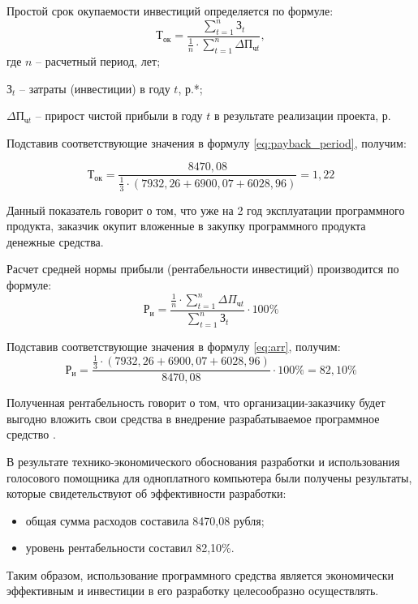 Простой срок окупаемости инвестиций определяется по формуле:
\begin{equation}
	\label{eq:payback_period}
	\mathrm{Т_{ок}} = \frac{\sum_{t=1}^{n} \text{З}_t}{\frac{1}{n} \cdot \sum_{t=1}^{n} \Delta \text{П}_{\text{ч}t}},
\end{equation}
где $n$ – расчетный период, лет;

\hspace{-0.9em}$\text{З}_t$ – затраты (инвестиции) в году $t$, р.*;  

\hspace{-0.9em}$\Delta\text{П}_{\text{ч}t}$ – прирост чистой прибыли в году $t$ в результате реализации проекта, р.

Подставив соответствующие значения в формулу \ref{eq:payback_period}, получим:

\[
\text{Т}_{\text{ок}} = \frac{8470{,}08}{\frac{1}{3} \cdot (7932{,}26 + 6900{,}07 + 6028{,}96)} = 1{,}22 
\]

Данный показатель говорит о том, что уже на 2 год эксплуатации программного продукта, заказчик окупит вложенные в закупку программного продукта денежные средства.

Расчет средней нормы прибыли (рентабельности инвестиций) производится по формуле: 
\begin{equation}
	\label{eq:arr}
	\mathrm{Р_{и}} = \frac{\frac{1}{n} \cdot \sum_{t=1}^n \Delta \Pi_{\text{ч}t}}{\sum_{t=1}^n \text{З}_t} \cdot 100\%
\end{equation}

Подставив соответствующие значения в формулу \ref{eq:arr}, получим:
\[
\mathrm{Р_{и}}  = \frac{\frac{1}{3} \cdot \left(7932{,}26 + 6900{,}07 + 6028{,}96\right)}{8470{,}08} \cdot 100\% = 82{,}10\%
\]

Полученная рентабельность говорит о том, что организации-заказчику будет выгодно вложить свои средства в внедрение разрабатываемое программное средство \cite{Economics}.

В результате технико-экономического обоснования разработки и использования голосового помощника для одноплатного компьютера были получены результаты, которые свидетельствуют об эффективности разработки:

\begin{itemize}
	\item общая сумма расходов составила 8470,08 рубля;
	\item уровень рентабельности составил 82,10\%.
\end{itemize}

Таким образом, использование программного средства является экономически эффективным и инвестиции в его разработку целесообразно осуществлять.


\newpage
